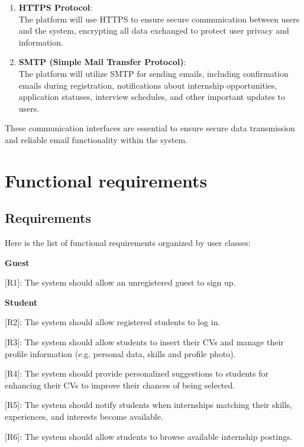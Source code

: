 \begin{enumerate}
\def\labelenumi{\arabic{enumi}.}
\item
  \textbf{HTTPS Protocol}:\\
  The platform will use HTTPS to ensure secure communication between
  users and the system, encrypting all data exchanged to protect user
  privacy and information.
\item
  \textbf{SMTP (Simple Mail Transfer Protocol)}:\\
  The platform will utilize SMTP for sending emails, including
  confirmation emails during registration, notifications about
  internship opportunities, application statuses, interview schedules,
  and other important updates to users.
\end{enumerate}

These communication interfaces are essential to ensure secure data
transmission and reliable email functionality within the system.


\section{Functional requirements}
\label{sec:functional_requirements}%


\subsection{Requirements}
\label{subsec:requirements}%


Here is the list of functional requirements organized by user classes:


\textbf{Guest}

{[}R1{]}: The system should allow an unregistered guest to sign up.

\textbf{Student}

{[}R2{]}: The system should allow registered students to log in.

{[}R3{]}: The system should allow students to insert their CVs and
manage their profile information (e.g. personal data, skills and profile
photo).

{[}R4{]}: The system should provide personalized suggestions to students
for enhancing their CVs to improve their chances of being selected.

{[}R5{]}: The system should notify students when internships matching
their skills, experiences, and interests become available.

{[}R6{]}: The system should allow students to browse available
internship postings.

